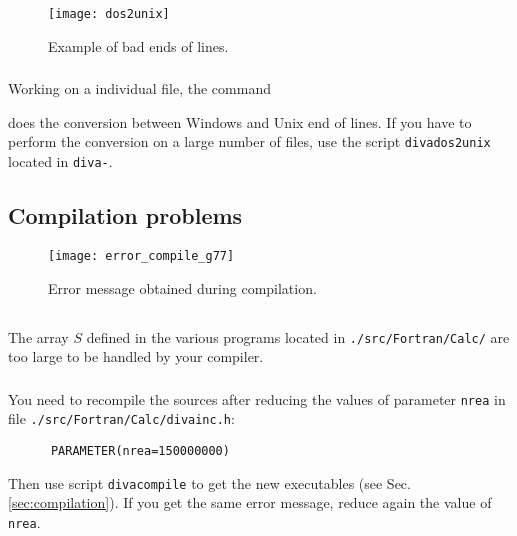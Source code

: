 \begin{figure}[htpb]
\centering
\texttt{[image: dos2unix]}
\caption{Example of bad ends of lines.\label{fig:error_dos2unix2}}
\end{figure}


\subsubsection{\answer}

Working on a individual file, the command\\


does the conversion between Windows and Unix end of lines.
If you have to perform the conversion on a large number of files, use the script \texttt{divados2unix} located in \texttt{diva-\divaversion}.



\subsection{Compilation problems\label{sec:error_compile}}


\begin{figure}[htpb]
\centering
\texttt{[image: error\_compile\_g77]}
\caption{Error message obtained during compilation. \label{fig:error_compile}}
\end{figure}

\subsection{\question}

The array $S$ defined in the various programs located in \texttt{./src/Fortran/Calc/} are too large to be handled by your compiler. 


\subsubsection{\answer}

You need to recompile the sources after reducing the values of parameter \texttt{nrea} in file \texttt{./src/Fortran/Calc/divainc.h}:
\begin{verbatim}
      PARAMETER(nrea=150000000)
\end{verbatim}
Then use script \texttt{divacompile} to get the new executables (see Sec. \ref{sec:compilation}). If you get the same error message, reduce again the value of \texttt{nrea}.

